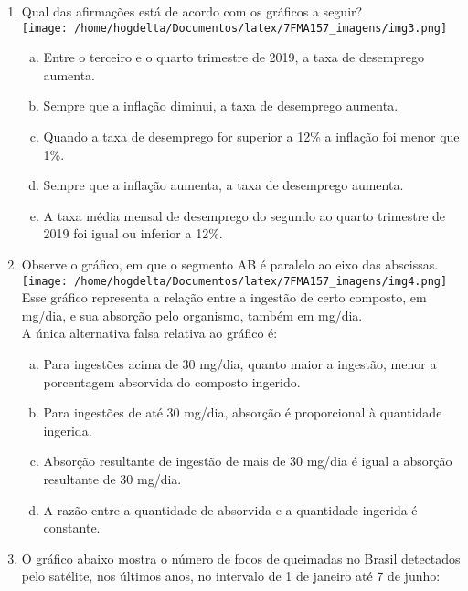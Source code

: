 \documentclass[a4paper,14pt]{article}
\begin{document}
\begin{multicols}{2}
\begin{enumerate}
		    \item Qual das afirmações está de acordo com os gráficos a seguir? \\
		    \texttt{[image: /home/hogdelta/Documentos/latex/7FMA157\_imagens/img3.png]} \\
		    \begin{enumerate}[a)]
		    	\item Entre o terceiro e o quarto trimestre de 2019, a taxa de desemprego aumenta.
		    	\item Sempre que a inflação diminui, a taxa de desemprego aumenta.
		    	\item Quando a taxa de desemprego for superior a 12\% a inflação foi menor que 1\%.
		    	\item Sempre que a inflação aumenta, a taxa de desemprego aumenta.
		    	\item A taxa média mensal de desemprego do segundo ao quarto trimestre de 2019 foi igual ou inferior a 12\%.
		    \end{enumerate}
	        \item Observe o gráfico, em que o segmento AB é paralelo ao eixo das abscissas.\\
	        \texttt{[image: /home/hogdelta/Documentos/latex/7FMA157\_imagens/img4.png]} \\
	        Esse gráfico representa a relação entre a ingestão de certo composto, em mg/dia, e sua absorção pelo organismo, também em mg/dia.\\
	        A única alternativa falsa relativa ao gráfico é:\\
	        \begin{enumerate}[a)]
	        	\item Para ingestões acima de 30 mg/dia, quanto maior a ingestão, menor a porcentagem absorvida do composto ingerido.
	        	\item Para ingestões de até 30 mg/dia, absorção é proporcional à quantidade ingerida.
	        	\item Absorção resultante de ingestão de mais de 30 mg/dia é igual a absorção resultante de 30 mg/dia.
	        	\item A razão entre a quantidade de absorvida e a quantidade ingerida é constante.
	        \end{enumerate}
            \item O gráfico abaixo mostra o número de focos de queimadas no Brasil detectados pelo satélite, nos últimos anos, no intervalo de 1 de janeiro até 7 de junho: \\

\end{enumerate}
\end{multicols}
\end{document}
